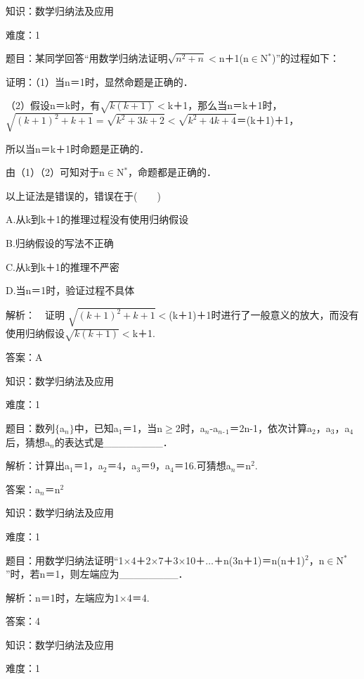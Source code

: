 \documentclass{article} %
\begin{document}
 

 知识：数学归纳法及应用

 难度：1

 题目：某同学回答``用数学归纳法证明$\sqrt{n^2+n}\mathrm{<}$n＋1(n$\mathrm{\in}$N${}^{*}$)''的过程如下：

 证明：（1）当n＝1时，显然命题是正确的．

（2）假设n＝k时，有$\sqrt{k(k+1)}\mathrm{<}$k＋1，那么当n＝k＋1时，$\sqrt{(k+1)^2+k+1}=\sqrt{k^2+3k+2}\mathrm{<}\sqrt{k^2+4k+4}$＝(k＋1)＋1，

所以当n＝k＋1时命题是正确的．

由（1）（2）可知对于n$\mathrm{\in}$N${}^{*}$，命题都是正确的．

以上证法是错误的，错误在于(　　)

A.从k到k＋1的推理过程没有使用归纳假设

B.归纳假设的写法不正确

C.从k到k＋1的推理不严密

D.当n＝1时，验证过程不具体

 解析：　证明  $\sqrt{(k+1)^2+k+1}\mathrm{<}$(k＋1)＋1时进行了一般意义的放大，而没有使用归纳假设$\sqrt{k(k+1)}\mathrm{<}$k＋1.

 答案：A

 

 知识：数学归纳法及应用

 难度：1

 题目：数列$\mathrm{\{}$a${}_{n}$$\mathrm{\}}$中，已知a${}_{1}$＝1，当n$\mathrm{\ge}$2时，a${}_{n}$-a${}_{n}$${}_{\textrm{-}}$${}_{1}$＝2n-1，依次计算a${}_{2}$，a${}_{3}$，a${}_{4}$后，猜想a${}_{n}$的表达式是\_\_\_\_\_\_\_\_．

 解析：计算出a${}_{1}$＝1，a${}_{2}$＝4，a${}_{3}$＝9，a${}_{4}$＝16.可猜想a${}_{n}$＝n${}^{2}$.

 答案：a${}_{n}$＝n${}^{2}$

 

 知识：数学归纳法及应用

 难度：1

 题目：用数学归纳法证明``1$\mathrm{\times}$4＋2$\mathrm{\times}$7＋3$\mathrm{\times}$10＋{$\dots$}＋n(3n＋1)＝n(n＋1)${}^{2}$，n$\mathrm{\in}$N${}^{*}$''时，若n＝1，则左端应为\_\_\_\_\_\_\_\_．

 解析：n＝1时，左端应为1$\mathrm{\times}$4＝4.

 答案：4

 

 知识：数学归纳法及应用

 难度：1
\end{document}
